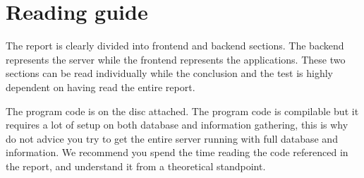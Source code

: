 \thispagestyle{empty}
\section*{Reading guide}
The report is clearly divided into frontend and backend sections. The backend represents the server while the frontend represents the applications. These two sections can be read individually while the conclusion and the test is highly dependent on having read the entire report.

The program code is on the disc attached. The program code is compilable but it requires a lot of setup on both database and information gathering, this is why do not advice you try to get the entire server running with full database and information. We recommend you spend the time reading the code referenced in the report, and understand it from a theoretical standpoint.

